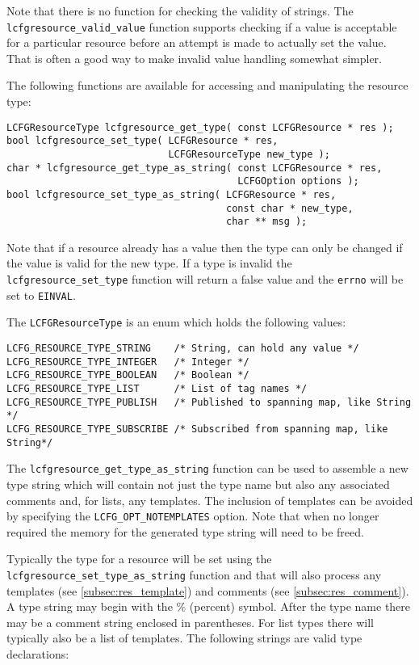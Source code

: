 \documentclass[11pt,a4paper,titlepage]{article}
\begin{document}
Note that there is no function for checking the validity of
strings. The \texttt{lcfgresource\_valid\_value} function supports
checking if a value is acceptable for a particular resource before an
attempt is made to actually set the value. That is often a good way to
make invalid value handling somewhat simpler.

The following functions are available for accessing and manipulating
the resource type:

\begin{verbatim}
LCFGResourceType lcfgresource_get_type( const LCFGResource * res );
bool lcfgresource_set_type( LCFGResource * res,
                            LCFGResourceType new_type );
char * lcfgresource_get_type_as_string( const LCFGResource * res,
                                        LCFGOption options );
bool lcfgresource_set_type_as_string( LCFGResource * res,
                                      const char * new_type,
                                      char ** msg );
\end{verbatim}

Note that if a resource already has a value then the type can only be
changed if the value is valid for the new type. If a type
is invalid the \texttt{lcfgresource\_set\_type} function will return a
false value and the \texttt{errno} will be set to \texttt{EINVAL}. 

The \texttt{LCFGResourceType} is an enum which holds the following
values:

\begin{verbatim}
LCFG_RESOURCE_TYPE_STRING    /* String, can hold any value */
LCFG_RESOURCE_TYPE_INTEGER   /* Integer */
LCFG_RESOURCE_TYPE_BOOLEAN   /* Boolean */
LCFG_RESOURCE_TYPE_LIST      /* List of tag names */
LCFG_RESOURCE_TYPE_PUBLISH   /* Published to spanning map, like String */
LCFG_RESOURCE_TYPE_SUBSCRIBE /* Subscribed from spanning map, like String*/
\end{verbatim}

The \texttt{lcfgresource\_get\_type\_as\_string} function can be used
to assemble a new type string which will contain not just the type
name but also any associated comments and, for lists, any
templates. The inclusion of templates can be avoided by specifying the
\texttt{LCFG\_OPT\_NOTEMPLATES} option. Note that when no longer
required the memory for the generated type string will need to be
freed.

Typically the type for a resource will be set using the
\texttt{lcfgresource\_set\_type\_as\_string} function and that will
also process any templates (see \ref{subsec:res_template}) and comments (see
\ref{subsec:res_comment}). A type string may begin with the $\%$ (percent)
symbol. After the type name there may be a comment string enclosed in
parentheses. For list types there will typically also be a list of
templates. The following strings are valid type declarations:
\end{document}
